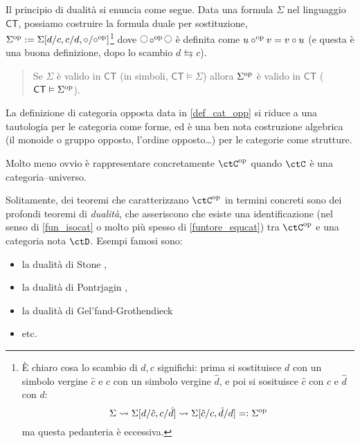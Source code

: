 \begin{proposition}
	Il principio di dualità si enuncia come segue.
	Data una formula \(\Sigma\) nel linguaggio \(\mathsf{CT}\), possiamo costruire la formula duale per sostituzione, \(\Sigma^{\text{op}}:=\Sigma[d/c,c/d,\circ/\circ^{\text{op}}]\)\footnote{\`E chiaro cosa lo scambio di \(d,c\) significhi: prima si sostituisce \(d\) con un simbolo vergine \(\hat c\) e \(c\) con un simbolo vergine \(\hat d\), e poi si sosituisce \(\hat c\) con \(c\) e \(\hat d\) con \(d\):
		\[\Sigma \rightsquigarrow \Sigma[d/\hat c,c/\hat d]\rightsquigarrow \Sigma[\hat c/c,\hat d/d] =:\Sigma^{\text{op}}\]
		ma questa pedanteria è eccessiva.} dove \(\blank\cmp^\op\blank\) è definita come \(u\circ^{\text{op}} v = v\circ u\) (e questa è una buona definizione, dopo lo scambio \(d\leftrightarrows c\)).
	\begin{quote}
		Se \(\Sigma\) è valido in \(\mathsf{CT}\) (in simboli, \(\mathsf{CT}\vDash \Sigma\)) allora \(\Sigma^{\text{op}}\) è valido in \(\mathsf{CT}\) (\(\mathsf{CT}\vDash \Sigma^{\text{op}}\)).
	\end{quote}
\end{proposition}
\begin{remark}
	La definizione di categoria opposta data in \ref{def_cat_opp} si riduce a una tautologia per le categoria come forme, ed è una ben nota costruzione algebrica (il monoide o gruppo opposto, l'ordine opposto\dots) per le categorie come strutture.

	Molto meno ovvio è rappresentare concretamente \(\ctC^\op\) quando \(\ctC\) è una categoria--universo.

	Solitamente, dei teoremi che caratterizzano \(\ctC^\op\) in termini concreti sono dei profondi teoremi di \emph{dualità}, che asseriscono che esiste una identificazione (nel senso di \ref{fun_isocat} o molto più spesso di \ref{funtore_equcat}) tra \(\ctC^\op\) e una categoria nota \(\ctD\). Esempi famosi sono:
	\begin{itemize}
		\item la dualità di Stone \cite{reffa_standard},
		\item la dualità di Pontrjagin \cite{reffa_standard},
		\item la dualità di Gel'fand-Grothendieck \cite{reffa_standard}
		\item etc.
	\end{itemize}
\end{remark}
